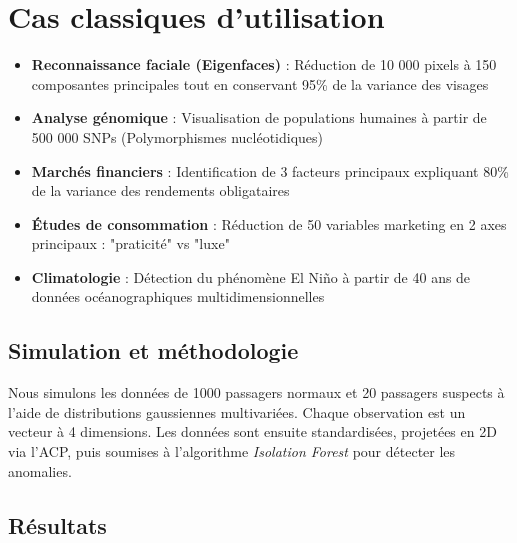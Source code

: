 \documentclass[a4paper,12pt]{report}
\begin{document}
\section{Cas classiques d'utilisation}
\begin{itemize}
    \item \textbf{Reconnaissance faciale (Eigenfaces)} : 
    Réduction de 10 000 pixels à 150 composantes principales tout en conservant 95\% de la variance des visages
    
    \item \textbf{Analyse génomique} : 
    Visualisation de populations humaines à partir de 500 000 SNPs (Polymorphismes nucléotidiques)
    
    \item \textbf{Marchés financiers} : 
    Identification de 3 facteurs principaux expliquant 80\% de la variance des rendements obligataires
    
    \item \textbf{Études de consommation} : 
    Réduction de 50 variables marketing en 2 axes principaux : "praticité" vs "luxe"
    
    \item \textbf{Climatologie} : 
    Détection du phénomène El Niño à partir de 40 ans de données océanographiques multidimensionnelles
\end{itemize}

\subsection{Simulation et m\'ethodologie}
Nous simulons les donn\'ees de 1000 passagers normaux et 20 passagers suspects \`a l'aide de distributions gaussiennes multivari\'ees. Chaque observation est un vecteur \`a 4 dimensions. Les donn\'ees sont ensuite standardis\'ees, projet\'ees en 2D via l'ACP, puis soumises \`a l'algorithme \textit{Isolation Forest} pour d\'etecter les anomalies.

\subsection{R\'esultats}
\end{document}
